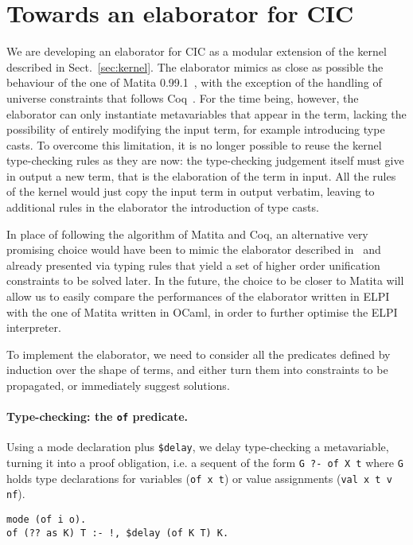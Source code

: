 \documentclass{easychair}
\begin{document}

\section{Towards an elaborator for CIC}\label{sec:cicelaborator}
We are developing an elaborator for CIC as a modular extension of the kernel described in Sect.~\ref{sec:kernel}. The elaborator mimics as close as possible the behaviour of the one of Matita 0.99.1~\cite{bidir}, with the exception of the handling of universe constraints that follows Coq~\cite{algebraic}. For the time being, however, the elaborator can only instantiate metavariables that appear in the term, lacking the possibility of entirely modifying the input term, for example introducing type casts. To overcome this limitation, it is no longer possible to reuse the kernel type-checking rules as they are now: the type-checking judgement itself must give in output a new term, that is the elaboration of the term in input. All the rules of the kernel would just copy the input term in output verbatim, leaving to additional rules in the elaborator the introduction of type casts.

In place of following the algorithm of Matita and Coq, an alternative very promising choice would have been to mimic the elaborator described in~\cite{abel} and already presented via typing rules that yield a set of higher order unification constraints to be solved later. In the future, the choice to be closer to Matita will allow us to easily compare the performances of the elaborator written in ELPI with the one of Matita written in OCaml, in order to further optimise the ELPI interpreter.

To implement the elaborator, we need to consider all the predicates defined by induction over the shape of terms, and either turn them into constraints to be propagated, or immediately suggest solutions.

\paragraph{Type-checking: the \texttt{of} predicate.}
Using a mode declaration plus \verb+$delay+, we delay type-checking a
metavariable, turning it into a proof obligation, i.e. a sequent of the form
\verb+G ?- of X t+
where \verb+G+ holds type declarations for variables (\verb+of x t+) or value assignments (\verb+val x t v nf+).

\begin{Verbatim}
mode (of i o).
of (?? as K) T :- !, $delay (of K T) K.
\end{Verbatim}
\end{document}
